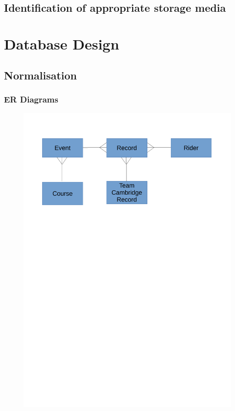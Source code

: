 \subsection{Identification of appropriate storage media}

\section{Database Design}

\subsection{Normalisation}

\subsubsection{ER Diagrams}
\begin{figure}[H]
    \includegraphics[width=\textwidth]{./ER/ERDesing.pdf}
\end{figure}


